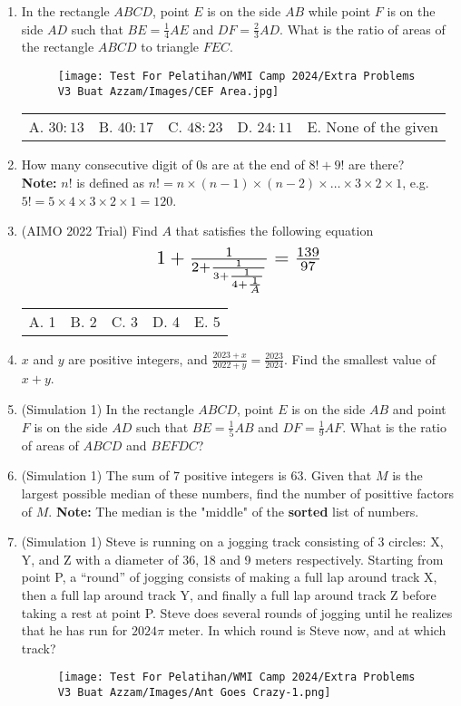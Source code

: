 \documentclass[11pt]{scrartcl}
\begin{document}
\begin{enumerate}
		\item In the rectangle $ABCD$, point $E$ is on the side $AB$ while point $F$ is on the side $AD$ such that $BE = \frac{1}{4}AE$ and $DF = \frac{2}{3}AD$. What is the ratio of areas of the rectangle $ABCD$ to triangle $FEC$.
		\begin{figure*}[h!]
			\centering
			\texttt{[image: Test For Pelatihan/WMI Camp 2024/Extra Problems V3 Buat Azzam/Images/CEF Area.jpg]}
		\end{figure*}
		
		\begin{tabular}{p{2.4cm} p{2.4cm} p{2.4cm} p{2.4cm} p{4cm}}
			A. $30:13$ & B. $40:17$ & C. $48:23$ & D. $24:11$ & E. None of the given
		\end{tabular}
		
		\item How many consecutive digit of 0s are at the end of $8! + 9!$ are there?\\
		\textbf{Note:} $n!$ is defined as $n! = n\times (n-1)\times (n-2)\times \ldots \times 3 \times 2 \times1$, e.g. $5! = 5\times4\times3\times2\times1=120$.
		
		\item (AIMO 2022 Trial) Find $A$ that satisfies the following equation
		\[\scalebox{1.5}{$1+\frac{1}{2+\frac{1}{3+\frac{1}{4+\frac{1}{A}}}} = \frac{139}{97}$}\]
		
		\begin{tabular}{p{2.5cm} p{2.5cm} p{2.5cm} p{2.5cm} p{2.5cm}}
			A. 1 & B. 2 & C. 3 & D. 4 & E. 5
		\end{tabular}
		\item $x$ and $y$ are positive integers, and $\frac{2023+x}{2022+y} = \frac{2023}{2024}$. Find the smallest value of $x+ y$.

		\item (Simulation 1) In the rectangle $ABCD$, point $E$ is on the side $AB$ and point $F$ is on the side $AD$ such that $BE = \frac{1}{5}AB$ and $DF = \frac{1}{9}AF$. What is the ratio of areas of $ABCD$ and $BEFDC$?
				
		\item (Simulation 1) The sum of $7$ positive integers is $63$. Given that $M$ is the largest possible median of these numbers, find the number of posittive factors of $M$.
		\textbf{Note:} The median is the "middle" of the \textbf{sorted} list of numbers.
		
		\item (Simulation 1) Steve is running on a jogging track consisting of 3 circles: X, Y, and Z with a diameter of 36, 18 and 9 meters	respectively. Starting from point P, a “round” of jogging consists of making a full lap around track X, then a full lap around track Y, and finally a full lap around track Z before taking a rest at point P. Steve does several rounds of jogging until he realizes that he has run for $2024\pi$ meter. In which round is Steve now, and at which track?
		\begin{figure*}[h]
			\centering
			\texttt{[image: Test For Pelatihan/WMI Camp 2024/Extra Problems V3 Buat Azzam/Images/Ant Goes Crazy-1.png]}
		\end{figure*}


\end{enumerate}
\end{document}
